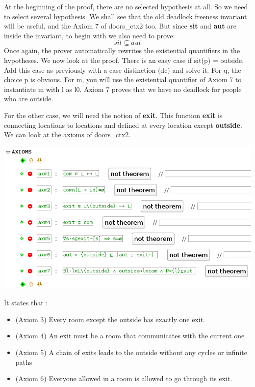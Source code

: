 At the beginning of the proof, there are no selected hypothesis at all. So we need to select several hypothesis. We shall see that the old deadlock freeness invariant will be useful, and the Axiom 7 of doors\_ctx2 too. But since \textbf{sit} and \textbf{aut} are inside the invariant, to begin with we also need to prove:
\[
sit \subseteq aut
\]
Once again, the prover automatically rewrites the existential quantifiers in the hypotheses. We now look at the proof. There is an easy case if sit(p) = outside. Add this case as previously with a case distinction (dc) and solve it. For q, the choice p is obvious. For m, you will use the existential quantifier of Axiom 7 to instantiate m with l as l0. 
Axiom 7 proves that we have no deadlock for people who are outside.

For the other case, we will need the notion of \textbf{exit}. This function \textbf{exit} is connecting locations to locations and defined at every location except \textbf{outside}. 
We can look at the axioms of doors\_ctx2. 
\begin{center}
	\includegraphics[]{img/tutorial/tut_10_axioms.png}
\end{center}

It states that :

\begin{itemize}
	\item (Axiom 3) Every room except the outside has exactly one exit. 
	\item (Axiom 4) An exit must be a room that communicates with the current one
	\item (Axiom 5) A chain of exits leads to the outside without any cycles or infinite paths
	\item (Axiom 6) Everyone allowed in a room is allowed to go through its exit. 
\end{itemize}  

